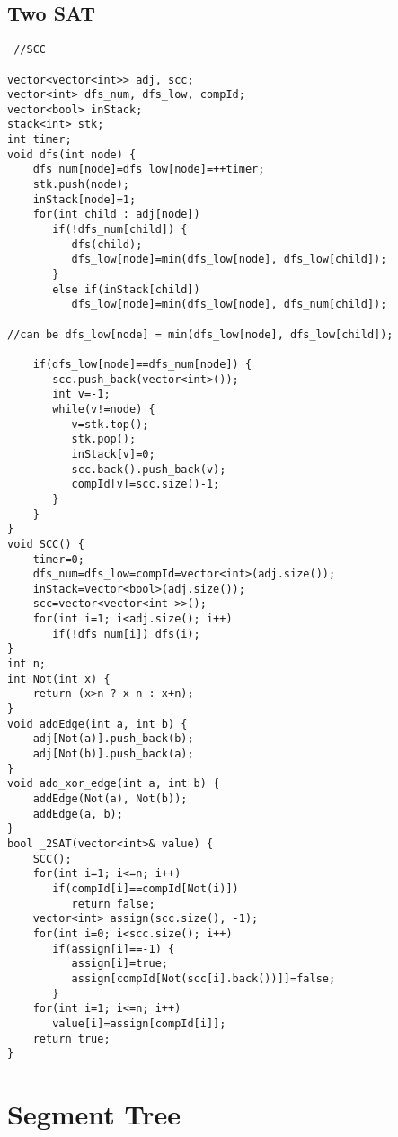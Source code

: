 \documentclass{article}
\begin{document}
\subsection{Two SAT}
\begin{verbatim}
 //SCC  
  
vector<vector<int>> adj, scc;  
vector<int> dfs_num, dfs_low, compId;  
vector<bool> inStack;  
stack<int> stk;  
int timer;  
void dfs(int node) {  
    dfs_num[node]=dfs_low[node]=++timer;  
    stk.push(node);  
    inStack[node]=1;  
    for(int child : adj[node])  
       if(!dfs_num[child]) {  
          dfs(child);  
          dfs_low[node]=min(dfs_low[node], dfs_low[child]);  
       }  
       else if(inStack[child])  
          dfs_low[node]=min(dfs_low[node], dfs_num[child]);  
  
//can be dfs_low[node] = min(dfs_low[node], dfs_low[child]);  
  
    if(dfs_low[node]==dfs_num[node]) {  
       scc.push_back(vector<int>());  
       int v=-1;  
       while(v!=node) {  
          v=stk.top();  
          stk.pop();  
          inStack[v]=0;  
          scc.back().push_back(v);  
          compId[v]=scc.size()-1;  
       }  
    }  
}  
void SCC() {  
    timer=0;  
    dfs_num=dfs_low=compId=vector<int>(adj.size());  
    inStack=vector<bool>(adj.size());  
    scc=vector<vector<int >>();  
    for(int i=1; i<adj.size(); i++)  
       if(!dfs_num[i]) dfs(i);  
}  
int n;  
int Not(int x) {  
    return (x>n ? x-n : x+n);  
}  
void addEdge(int a, int b) {  
    adj[Not(a)].push_back(b);  
    adj[Not(b)].push_back(a);  
}  
void add_xor_edge(int a, int b) {  
    addEdge(Not(a), Not(b));  
    addEdge(a, b);  
}  
bool _2SAT(vector<int>& value) {  
    SCC();  
    for(int i=1; i<=n; i++)  
       if(compId[i]==compId[Not(i)])  
          return false;  
    vector<int> assign(scc.size(), -1);  
    for(int i=0; i<scc.size(); i++)  
       if(assign[i]==-1) {  
          assign[i]=true;  
          assign[compId[Not(scc[i].back())]]=false;  
       }  
    for(int i=1; i<=n; i++)  
       value[i]=assign[compId[i]];  
    return true;  
}
\end{verbatim}

\section{Segment Tree}
\end{document}
